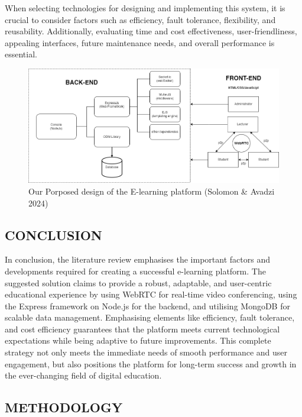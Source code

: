 \documentclass[a4paper,12pt]{article}  %
\begin{document}
When selecting technologies for designing and implementing this system, it is
crucial to consider factors such as efficiency, fault tolerance, flexibility,
and reusability. Additionally, evaluating time and cost effectiveness,
user-friendliness, appealing interfaces, future maintenance needs, and overall
performance is essential.\\

\begin{figure}[H]
      \centering
      \includegraphics[width=1\textwidth]{figures/proposed.png}
      \caption{Our Porposed design of the E-learning platform (Solomon \& Avadzi 2024)}
\end{figure}

\subsection{CONCLUSION}
In conclusion, the literature review emphasises the important factors and
developments required for creating a successful e-learning platform. The
suggested solution claims to provide a robust, adaptable, and user-centric
educational experience by using WebRTC for real-time video conferencing, using
the Express framework on Node.js for the backend, and utilising MongoDB for
scalable data management. Emphasising elements like efficiency, fault
tolerance, and cost efficiency guarantees that the platform meets current
technological expectations while being adaptive to future improvements. This
complete strategy not only meets the immediate needs of smooth performance and
user engagement, but also positions the platform for long-term success and
growth in the ever-changing field of digital education.\\ \newpage

\begin{center}
\section{METHODOLOGY}
\end{center}
\end{document}

